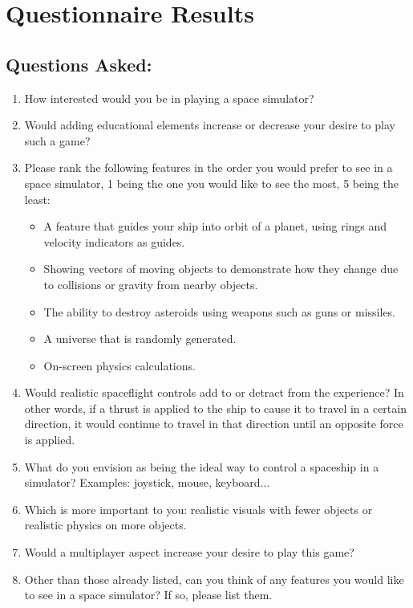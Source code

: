 \section{Questionnaire Results}

\subsection{Questions Asked:}
\begin{enumerate}

  \item How interested would you be in playing a space simulator?

  \item Would adding educational elements increase or decrease your desire to play such a game?

  \item Please rank the following features in the order you would prefer to see in a space simulator, 1 being the one you would like to see the most, 5 being the least:
  \begin{itemize}

        \item A feature that guides your ship into orbit of a planet, using rings and velocity indicators as guides.

        \item Showing vectors of moving objects to demonstrate how they change due to collisions or gravity from nearby objects.

        \item The ability to destroy asteroids using weapons such as guns or missiles.

        \item A universe that is randomly generated.

        \item On-screen physics calculations.

  \end{itemize}

  \item Would realistic spaceflight controls add to or detract from the experience? In other words, if a thrust is applied to the ship to cause it to travel in a certain direction, it would continue to travel in that direction until an opposite force is applied.

  \item What do you envision as being the ideal way to control a spaceship in a simulator? Examples: joystick, mouse, keyboard...

  \item Which is more important to you: realistic visuals with fewer objects or realistic physics on more objects.

  \item Would a multiplayer aspect increase your desire to play this game?

  \item Other than those already listed, can you think of any features you would like to see in a space simulator? If so, please list them.

\end{enumerate}

